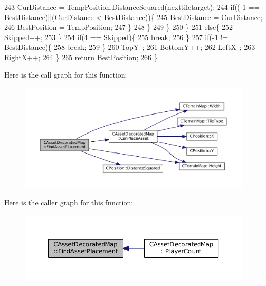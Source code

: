 \begin{DoxyCode}
243                     CurDistance = TempPosition.DistanceSquared(nexttiletarget);
244                     \textcolor{keywordflow}{if}((-1 == BestDistance)||(CurDistance < BestDistance))\{
245                         BestDistance = CurDistance;
246                         BestPosition = TempPosition;
247                     \}
248                 \}
249             \}
250         \}
251         \textcolor{keywordflow}{else}\{
252             Skipped++;   
253         \}
254         \textcolor{keywordflow}{if}(4 == Skipped)\{
255             \textcolor{keywordflow}{break};   
256         \}
257         \textcolor{keywordflow}{if}(-1 != BestDistance)\{
258             \textcolor{keywordflow}{break};    
259         \}
260         TopY--;
261         BottomY++;
262         LeftX--;
263         RightX++;
264     \}
265     \textcolor{keywordflow}{return} BestPosition;
266 \}
\end{DoxyCode}
Here is the call graph for this function\+:
\nopagebreak
\begin{figure}[H]
\begin{center}
\leavevmode
\includegraphics[width=350pt]{classCAssetDecoratedMap_a82c30235ceaa63c7382c662687acf9fe_cgraph}
\end{center}
\end{figure}
Here is the caller graph for this function\+:
\nopagebreak
\begin{figure}[H]
\begin{center}
\leavevmode
\includegraphics[width=350pt]{classCAssetDecoratedMap_a82c30235ceaa63c7382c662687acf9fe_icgraph}
\end{center}
\end{figure}
\hypertarget{classCAssetDecoratedMap_a4029b81572e80d897eb4e165c6e925be}{}\label{classCAssetDecoratedMap_a4029b81572e80d897eb4e165c6e925be} 
